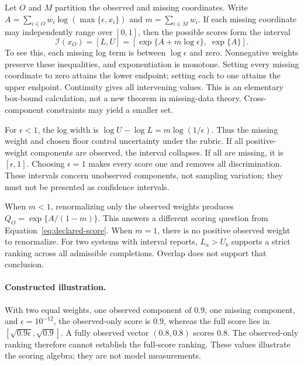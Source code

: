 \documentclass[10pt]{article}
\begin{document}
Let $O$ and $M$ partition the observed and missing coordinates. Write
$A=\sum_{i\in O}w_i\log(\max\{\epsilon,x_i\})$ and
$m=\sum_{i\in M}w_i$. If each missing coordinate may independently range over
$[0,1]$, then the possible scores form the interval
\begin{equation}
 \mathcal{I}(x_O)=[L,U]
 =\left[\exp\{A+m\log\epsilon\},\;\exp\{A\}\right].
 \label{eq:score-interval}
\end{equation}
To see this, each missing log term is between $\log\epsilon$ and zero.
Nonnegative weights preserve these inequalities, and exponentiation is
monotone. Setting every missing coordinate to zero attains the lower endpoint;
setting each to one attains the upper endpoint. Continuity gives all intervening
values. This is an elementary box-bound calculation, not a new theorem in
missing-data theory. Cross-component constraints may yield a smaller set.

For $\epsilon<1$, the log width is
$\log U-\log L=m\log(1/\epsilon)$. Thus the missing weight and chosen floor
control uncertainty under the rubric. If all positive-weight components are
observed, the interval collapses. If all are missing, it is $[\epsilon,1]$.
Choosing $\epsilon=1$ makes every score one and removes all discrimination.
These intervals concern unobserved components, not sampling variation; they
must not be presented as confidence intervals.

When $m<1$, renormalizing only the observed weights produces
$Q_O=\exp\{A/(1-m)\}$. This answers a different scoring question from
Equation~\ref{eq:declared-score}. When $m=1$, there is no positive observed
weight to renormalize. For two systems with interval reports, $L_a>U_b$ supports
a strict ranking across all admissible completions. Overlap does not support
that conclusion.

\paragraph{Constructed illustration.}
With two equal weights, one observed component of $0.9$, one missing component,
and $\epsilon=10^{-12}$, the observed-only score is $0.9$, whereas the full
score lies in $[\sqrt{0.9\epsilon},\sqrt{0.9}]$. A fully observed vector
$(0.8,0.8)$ scores $0.8$. The observed-only ranking therefore cannot establish
the full-score ranking. These values illustrate the scoring algebra; they are
not model measurements.
\end{document}

